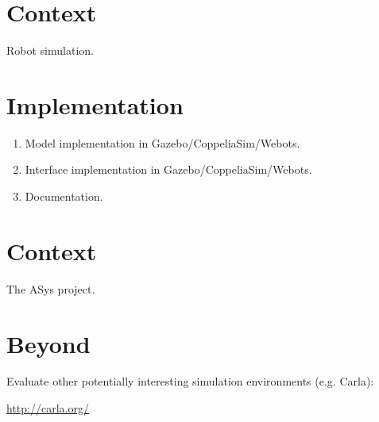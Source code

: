 \documentclass[a4paper]{article}
\begin{document}
\section{Context}

Robot simulation.

\section{Implementation}

\begin{enumerate}
\item Model implementation in Gazebo/CoppeliaSim/Webots.
\item Interface implementation in Gazebo/CoppeliaSim/Webots.
\item Documentation.
\end{enumerate}


\section{Context}

The ASys project.

\section{Beyond}

Evaluate other potentially interesting simulation environments (e.g. Carla):

\url{http://carla.org/}


\nocite{*}



\end{document}
